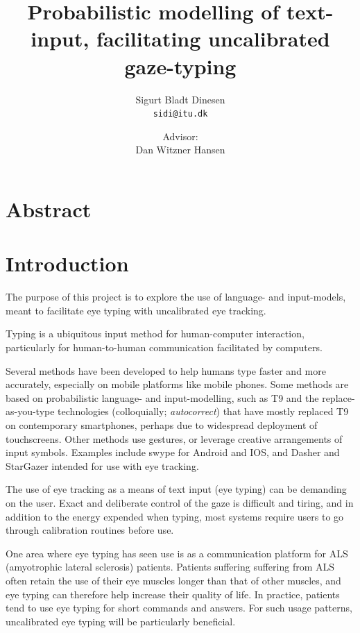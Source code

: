\documentclass[a4paper, titlepage]{article}
\renewcommand{\%}{\scalebox{.9}{\oldpct}}
\begin{document}
\title{Probabilistic modelling of text-input, facilitating uncalibrated
gaze-typing}
\author{
	Sigurt Bladt Dinesen
	\\\texttt{sidi@itu.dk}
	\and
	Advisor:
	\\Dan Witzner Hansen
}


\maketitle
\tableofcontents

\clearpage

\section{Abstract}

\section{Introduction}
The purpose of this project is to explore the use of language- and
input-models, meant to facilitate eye typing with uncalibrated eye tracking.

Typing is a ubiquitous input method for human-computer interaction, particularly for human-to-human communication facilitated by computers.

Several methods have been developed to help humans type faster and more
accurately, especially on mobile platforms like mobile phones. Some
methods are based on probabilistic language- and input-modelling, such
as T9 and the replace-as-you-type technologies (colloquially;
\emph{autocorrect}) that have mostly replaced T9 on contemporary
smartphones, perhaps due to widespread deployment of touchscreens. Other
methods use gestures, or leverage creative arrangements of input
symbols. Examples include swype for Android and IOS, and Dasher and
StarGazer intended for use with eye tracking.

The use of eye tracking as a means of text input (eye typing) can be
demanding on the user. Exact and deliberate control of the gaze is
difficult and tiring, and in addition to the energy expended when
typing, most systems require users to go through calibration routines
before use.

One area where eye typing has seen use is as a communication platform
for ALS (amyotrophic lateral sclerosis) patients. Patients suffering
suffering from ALS often retain the use of their eye muscles longer than
that of other muscles, and eye typing can therefore help increase their
quality of life. In practice, patients tend to use eye typing
for short commands and answers. For such usage patterns, uncalibrated
eye typing will be particularly beneficial.
\end{document}
